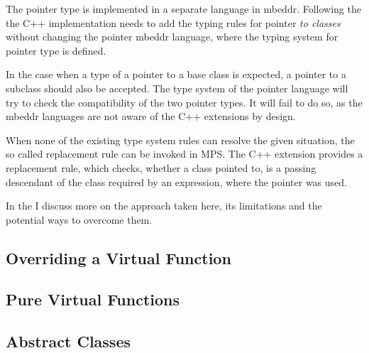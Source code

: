 The pointer type is implemented in a separate language in mbeddr. Following the  the C++ implementation
needs to add the typing rules for pointer \emph{to classes} without changing the pointer mbeddr language, where the 
typing system for pointer type is defined.

In the case when a type of a pointer to a base class is expected, a pointer to a subclass should also be accepted.
The type system of the pointer language will try to check the compatibility of the two pointer types. It will
fail to do so, as the mbeddr languages are not aware of the C++ extensions by design.

When none of the existing type system rules can resolve the given situation, the so called replacement
rule can be invoked in MPS. The C++ extension provides a replacement rule, which checks, whether a
class pointed to, is a passing descendant of the class required by an expression, where the pointer was
used.

In the  I discuss more on the approach taken here, its limitations and 
the potential ways to overcome them.

\subsection{Overriding a Virtual Function}

\subsection{Pure Virtual Functions}

\subsection{Abstract Classes}


